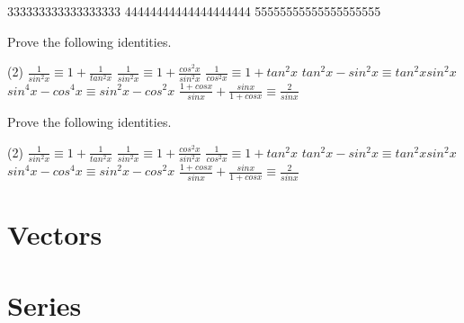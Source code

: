 \begin{solution}

333333333333333333
44444444444444444444
55555555555555555555
\end{solution}
\newpage


\begin{exercise}
    Prove the following identities.
    \begin{tasks}[after-item-skip=2pt,after-skip=3pt](2)
        \task $ \displaystyle \frac {1} {sin^2 x} \equiv 1+ \frac {1} {tan^2x} $ 
        \task $ \displaystyle \frac {1} {sin^2 x} \equiv 1+ \frac {cos^2 x} {sin^2x} $
        \task $ \displaystyle \frac {1} {cos^2 x} \equiv 1+ tan^2x $
        \task $ tan^2x-sin^2x \equiv tan^2x sin^2x $ 
        \task $ sin^4x-cos^4x \equiv sin^2x-cos^2x $
        \task $ \displaystyle \frac{1+cosx}{sinx}+\frac{sinx}{1+cosx} \equiv \frac{2}{sinx} $
    \end{tasks}
\end{exercise}



\begin{solution}
    Prove the following identities.
    \begin{tasks}[after-item-skip=2pt,after-skip=3pt](2)
        \task $ \displaystyle \frac {1} {sin^2 x} \equiv 1+ \frac {1} {tan^2x} $ 
        \task $ \displaystyle \frac {1} {sin^2 x} \equiv 1+ \frac {cos^2 x} {sin^2x} $
        \task $ \displaystyle \frac {1} {cos^2 x} \equiv 1+ tan^2x $
        \task $ tan^2x-sin^2x \equiv tan^2x sin^2x $ 
        \task $ sin^4x-cos^4x \equiv sin^2x-cos^2x $
        \task $ \displaystyle \frac{1+cosx}{sinx}+\frac{sinx}{1+cosx} \equiv \frac{2}{sinx} $
    \end{tasks}
\end{solution}


\section{Vectors}


\section{Series}


